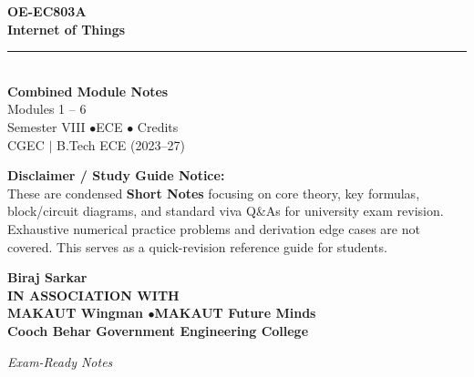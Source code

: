 \documentclass[12pt,a4paper]{article}
\begin{document}
\thispagestyle{empty}


\vspace*{1.0cm}
\begin{center}
  {\Huge\bfseries\color{myred} OE-EC803A}\\[10pt]
  {\LARGE\bfseries\color{mydark} Internet of Things}\\[20pt]
  {\color{myred}\rule{0.7\linewidth}{1.5pt}}\\[18pt]
  {\Large\color{myteal}\textbf{Combined Module Notes}}\\[8pt]
  {\large\color{mydark} Modules 1 -- 6}\\[40pt]
  {\normalsize\color{mydark} Semester VIII \quad$\bullet$\quad ECE \quad$\bullet$ Credits}\\[12pt]
  {\normalsize\color{mydark} CGEC \;$|$\; B.Tech ECE (2023--27)}
\end{center}
\vspace{1.0cm}
\begin{center}
  \begin{tcolorbox}[colback=mygray, colframe=mgframe, boxrule=0.5pt, arc=3pt, width=0.85\linewidth]
    \centering\small\color{mydark}
    \textbf{Disclaimer / Study Guide Notice:}\\
    These are condensed \textbf{Short Notes} focusing on core theory, key formulas, block/circuit diagrams, and standard viva Q\&As for university exam revision. Exhaustive numerical practice problems and derivation edge cases are not covered. This serves as a quick-revision reference guide for students.
  \end{tcolorbox}
\end{center}
\vfill
\vspace{0.6cm}
\begin{center}
  {\large\bfseries\color{mypurple} Biraj Sarkar}\\[16pt]
  {\footnotesize\color{watermark}\textbf{IN ASSOCIATION WITH}}\\[8pt]
  {\small\bfseries\color{mydark} MAKAUT Wingman \quad$\bullet$\quad MAKAUT Future Minds}\\[12pt]
  {\large\bfseries\color{myteal} Cooch Behar Government Engineering College}
\end{center}
\vfill
\begin{center}{\small\color{watermark}\textit{Exam-Ready Notes}}\end{center}
\clearpage
\end{document}
